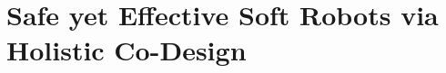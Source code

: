 \chapter{Safe yet Effective Soft Robots via Holistic Co-Design}
\label{chp:apx:holisticcodesign}

\begin{foreword}

\end{foreword}
